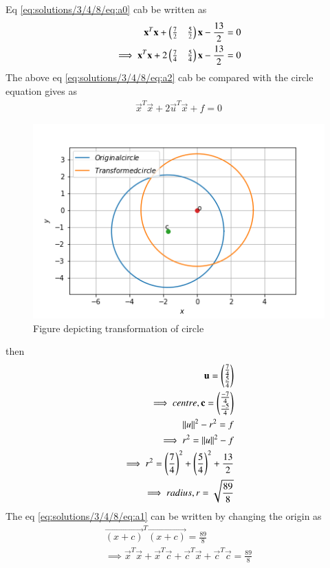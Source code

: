 Eq \eqref{eq:solutions/3/4/8/eq:a0} cab be written as
\begin{align}
\mathbf{x}^T\mathbf{x}+\begin{pmatrix}\frac{7}{2}&\frac{5}{2}\end{pmatrix}\mathbf{x}-\frac{13}{2}=0\\
\implies \mathbf{x}^T\mathbf{x}+2\begin{pmatrix}\frac{7}{4}&\frac{5}{4}\end{pmatrix}\mathbf{x}-\frac{13}{2}=0
\label{eq:solutions/3/4/8/eq:a2}
\end{align}
The above eq \eqref{eq:solutions/3/4/8/eq:a2} cab be compared with the circle equation gives as
\begin{align}
\vec{x}^T\vec{x}+2\vec{u}^T\vec{x}+f=0
\label{eq:solutions/3/4/8/eq:a3}
\end{align}
\begin{figure}[!ht]
	\centering
	\includegraphics[width=\columnwidth]{./solutions/3/4/8/circle.png}
	\caption{Figure depicting transformation of circle}
	\label{eq:solutions/3/4/8/myfig}
\end{figure}
then
\begin{align}
\mathbf{u} = \begin{pmatrix}\frac{7}{4}\\\frac{5}{4}\end{pmatrix}\\
\label{eq:solutions/3/4/8/eq:a4}
\implies centre, \mathbf{c} = \begin{pmatrix}\frac{-7}{4}\\\frac{-5}{4}\end{pmatrix}\\
\left\lVert u\right\rVert^2 - r^2 = f\\
\implies r^2 = \left\lVert u\right\rVert^2 - f\\
\implies r^2 = \left(\frac{7}{4}\right)^2+\left(\frac{5}{4}\right)^2+\frac{13}{2}\\
\implies radius, r = \sqrt{\frac{89}{8}}
\end{align}
The eq \eqref{eq:solutions/3/4/8/eq:a1} can be written by changing the origin as
\begin{align}
\vec{(x+c)}^T\vec{(x+c)} = \frac{89}{8}\\
\implies \vec{x}^T\vec{x}+\vec{x}^T\vec{c}+\vec{c}^T\vec{x}+\vec{c}^T\vec{c} = \frac{89}{8}
\label{eq:solutions/3/4/8/eq:a5}
\end{align}

